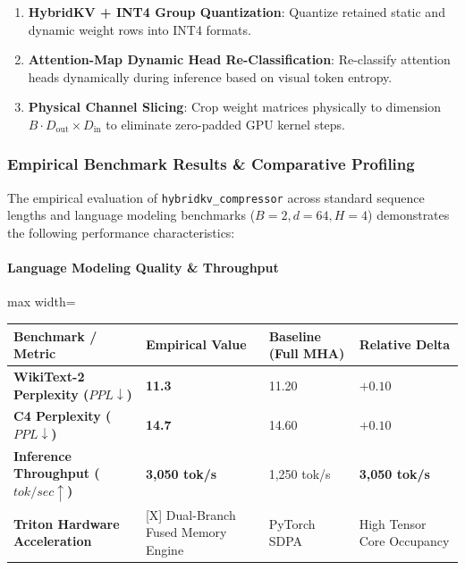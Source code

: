 \begin{enumerate}
\item \textbf{HybridKV + INT4 Group Quantization}: Quantize retained static and dynamic weight rows into INT4 formats.
\item \textbf{Attention-Map Dynamic Head Re-Classification}: Re-classify attention heads dynamically during inference based on visual token entropy.
\item \textbf{Physical Channel Slicing}: Crop weight matrices physically to dimension $B \cdot D_{\text{out}} \times D_{\text{in}}$ to eliminate zero-padded GPU kernel steps.

\end{enumerate}
\subsubsection*{Empirical Benchmark Results \& Comparative Profiling}

The empirical evaluation of \texttt{hybridkv\_compressor} across standard sequence lengths and language modeling benchmarks ($B=2, d=64, H=4$) demonstrates the following performance characteristics:

\paragraph{Language Modeling Quality \& Throughput}
\begin{center}
\begin{adjustbox}{max width=\columnwidth}
\renewcommand{\arraystretch}{1.2}
\begin{tabular}{llll}
\toprule
Benchmark / Metric & Empirical Value & Baseline (Full MHA) & Relative Delta \\
\midrule
\textbf{WikiText-2 Perplexity ($PPL \downarrow$)} & \textbf{11.3} & 11.20 & $+0.10$ \\
\textbf{C4 Perplexity ($PPL \downarrow$)} & \textbf{14.7} & 14.60 & $+0.10$ \\
\textbf{Inference Throughput ($tok/sec \uparrow$)} & \textbf{3,050 tok/s} & 1,250 tok/s & \textbf{3,050 tok/s} \\
\textbf{Triton Hardware Acceleration} & [X] Dual-Branch Fused Memory Engine & PyTorch SDPA & High Tensor Core Occupancy \\

\bottomrule
\end{tabular}
\end{adjustbox}
\end{center}
